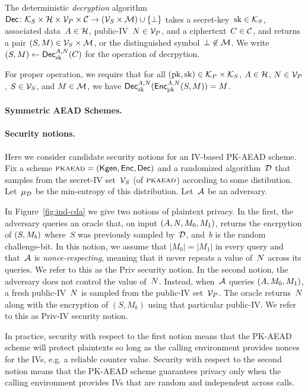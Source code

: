 The deterministic \emph{decryption} algorithm ${\mathsf{Dec}} \colon \mathcal{K}_S \times \mathcal{H} \times \mathcal{V}_P \times \mathcal{C} \to \left(\mathcal{V}_S \times \mathcal{M}\right) \cup \{\bot\}$ takes a secret-key~$\mathrm{sk}\in\mathcal{K}_S$, associated data~$A \in \mathcal{H}$, public-IV~$N \in \mathcal{V}_P$, and a ciphertext~$C \in \mathcal{C}$, and returns a pair $(S,M) \in \mathcal{V}_S\times\mathcal{M}$, or the distinguished symbol~$\bot \not\in \mathcal{M}$.  We write $(S,M) \gets {\mathsf{Dec}}_{\mathrm{sk}}^{A,N}(C)$ for the operation of decrpytion. 

For proper operation, we require that for all $(\mathrm{pk},\mathrm{sk})\in\mathcal{K}_P\times\mathcal{K}_S$, $A\in\mathcal{H}$, $N\in\mathcal{V}_P$, $S\in\mathcal{V}_S$, and $M\in\mathcal{M}$, we have ${\mathsf{Dec}}_{\mathrm{sk}}^{A,N}({\mathsf{Enc}}_{\mathrm{pk}}^{A,N}(S,M))=M$.


\paragraph{Symmetric AEAD Schemes. } 


\paragraph{Security notions. } 
Here we consider candidate security notions for an IV-based PK-AEAD scheme.  Fix a scheme $\textsc{pkaead}=(\mathsf{Kgen},{\mathsf{Enc}},{\mathsf{Dec}})$ and a randomized algorithm~${\cal D}$ that samples from the secret-IV set~$\mathcal{V}_S$ (of $\textsc{pkaead}$) according to some distibution.  Let~$\mu_{\cal D}$ be the min-entropy of this distribution.  Let~${\cal A}$ be an adversary.  

In Figure~\ref{fig:ind-cda} we give two notions of plaintext privacy.  In the first, the adversary queries an oracle that, on input $(A,N,M_0,M_1)$, returns the encrpytion of $(S,M_b)$ where~$S$ was previously sampled by~${\cal D}$, and~$b$ is the random challenge-bit.  In this notion, we assume that $|M_0|=|M_1|$ in every query and that~${\cal A}$ is \emph{nonce-respecting}, meaning that it never repeats a value of~$N$ across its queries.  We refer to this as the Priv security notion.
In the second notion, the adversary does not control the value of~$N$.  Instead, when~${\cal A}$ queries $(A,M_0,M_1)$, a fresh public-IV~$N$ is sampled from the public-IV set~$\mathcal{V}_P$.  The oracle returns~$N$ along with the encryption of $(S,M_b)$ using that particular public-IV.  We refer to this as Priv-IV security notion.

In practice, security with respect to the first notion means that the PK-AEAD scheme will protect plaintexts so long as the calling environment provides nonces for the IVs, e.g. a reliable counter value.  Security with respect to the second notion means that the PK-AEAD scheme guarantees privacy only when the calling environment provides IVs that are random and independent across calls.

